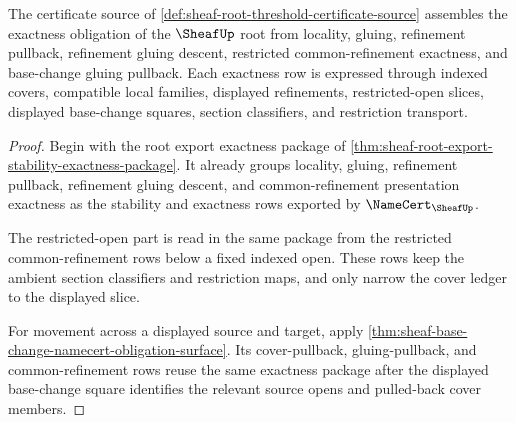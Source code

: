 \begin{theorem}
\label{thm:sheaf-root-threshold-gluing-refinement-obligation}
The certificate source of \autoref{def:sheaf-root-threshold-certificate-source} assembles the exactness obligation of the $\SheafUp$ root from locality, gluing, refinement pullback, refinement gluing descent, restricted common-refinement exactness, and base-change gluing pullback. Each exactness row is expressed through indexed covers, compatible local families, displayed refinements, restricted-open slices, displayed base-change squares, section classifiers, and restriction transport.
\end{theorem}
\begin{proof}
Begin with the root export exactness package of \autoref{thm:sheaf-root-export-stability-exactness-package}. It already groups locality, gluing, refinement pullback, refinement gluing descent, and common-refinement presentation exactness as the stability and exactness rows exported by $\NameCert_{\SheafUp}$.

The restricted-open part is read in the same package from the restricted common-refinement rows below a fixed indexed open. These rows keep the ambient section classifiers and restriction maps, and only narrow the cover ledger to the displayed slice.

For movement across a displayed source and target, apply \autoref{thm:sheaf-base-change-namecert-obligation-surface}. Its cover-pullback, gluing-pullback, and common-refinement rows reuse the same exactness package after the displayed base-change square identifies the relevant source opens and pulled-back cover members.
\end{proof}

